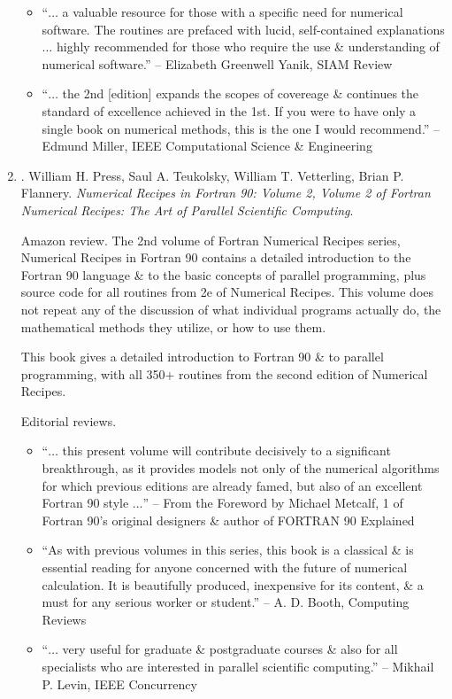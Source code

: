 \documentclass{article}
\begin{document}
\begin{enumerate}
\begin{itemize}
		\item ``$\ldots$ a valuable resource for those with a specific need for numerical software. The routines are prefaced with lucid, self-contained explanations $\ldots$ highly recommended for those who require the use \& understanding of numerical software.'' -- {\sc Elizabeth Greenwell Yanik}, SIAM Review
		\item ``$\ldots$ the 2nd [edition] expands the scopes of covereage \& continues the standard of excellence achieved in the 1st. If you were to have only a single book on numerical methods, this is the one I would recommend.'' -- {\sc Edmund Miller}, IEEE Computational Science \& Engineering
	\end{itemize}
	
	\item \cite{Press_Teukolsky_Vetterling_Flannery_recipe_Fortran90}. {\sc William H. Press, Saul A. Teukolsky, William T. Vetterling, Brian P. Flannery}. {\it Numerical Recipes in Fortran 90: Volume 2, Volume 2 of Fortran Numerical Recipes: The Art of Parallel Scientific Computing}. {}
	
	{\sf Amazon review.} The 2nd volume of Fortran Numerical Recipes series, Numerical Recipes in Fortran 90 contains a detailed introduction to the Fortran 90 language \& to the basic concepts of parallel programming, plus source code for all routines from 2e of Numerical Recipes. This volume does not repeat any of the discussion of what individual programs actually do, the mathematical methods they utilize, or how to use them.
	
	This book gives a detailed introduction to Fortran 90 \& to parallel programming, with all 350+ routines from the second edition of Numerical Recipes.
	
	{\sf Editorial reviews.}
	\begin{itemize}
		\item ``$\ldots$ this present volume will contribute decisively to a significant breakthrough, as it provides models not only of the numerical algorithms for which previous editions are already famed, but also of an excellent Fortran 90 style $\ldots$'' -- From the Foreword by {\sc Michael Metcalf}, 1 of Fortran 90's original designers \& author of FORTRAN 90 Explained
		\item ``As with previous volumes in this series, this book is a classical \& is essential reading for anyone concerned with the future of numerical calculation. It is beautifully produced, inexpensive for its content, \& a must for any serious worker or student.'' -- {\sc A. D. Booth}, Computing Reviews
		\item ``$\ldots$ very useful for graduate \& postgraduate courses \& also for all specialists who are interested in parallel scientific computing.'' -- {\sc Mikhail P. Levin}, IEEE Concurrency
	\end{itemize}
	

\end{enumerate}
\end{document}
